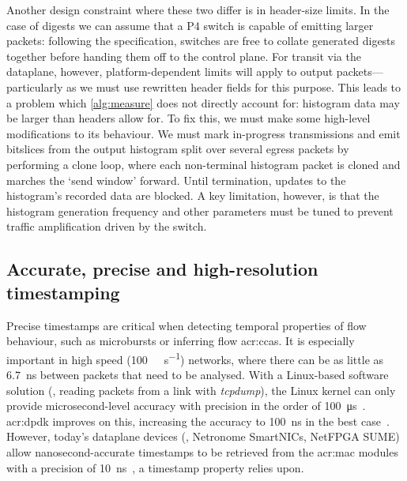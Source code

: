 Another design constraint where these two differ is in header-size limits.
In the case of digests we can assume that a P4 switch is capable of emitting larger packets: following the specification, switches are free to collate generated digests together before handing them off to the control plane.
For transit via the dataplane, however, platform-dependent limits will apply to output packets---particularly as we must use rewritten header fields for this purpose.
This leads to a problem which \cref{alg:measure} does not directly account for: histogram data may be larger than headers allow for.
To fix this, we must make some high-level modifications to its behaviour.
We must mark in-progress transmissions and emit bitslices from the output histogram split over several egress packets by performing a clone loop, where each non-terminal histogram packet is cloned and marches the `send window' forward.
Until termination, updates to the histogram's recorded data are blocked.
A key limitation, however, is that the histogram generation frequency and other parameters must be tuned to prevent traffic amplification driven by the switch.

\subsection{Accurate, precise and high-resolution timestamping}

Precise timestamps are critical when detecting temporal properties of flow behaviour, such as microbursts or inferring flow \glspl{acr:cca}.
It is especially important in high speed (\qty{100}{\giga\bit\per\second}) networks, where there can be as little as \qty{6.7}{\nano\second} between packets that need to be analysed.
With a Linux-based software solution (\eg, reading packets from a link with \emph{tcpdump}), the Linux kernel can only provide microsecond-level accuracy with precision in the order of \qty{100}{\micro\second}~\parencite{DBLP:conf/noms/KundelSBRK20}.
\gls{acr:dpdk} improves on this, increasing the accuracy to \qty{100}{\nano\second} in the best case~\parencite{DBLP:journals/ccr/PrimoracBA17}.
However, today's dataplane devices (\eg, Netronome SmartNICs, NetFPGA SUME) allow nanosecond-accurate timestamps to be retrieved from the \gls{acr:mac} modules with a precision of \qty{10}{\nano\second}~\parencite{DBLP:conf/noms/KundelSBRK20}, a timestamp property \seidr{} relies upon.



